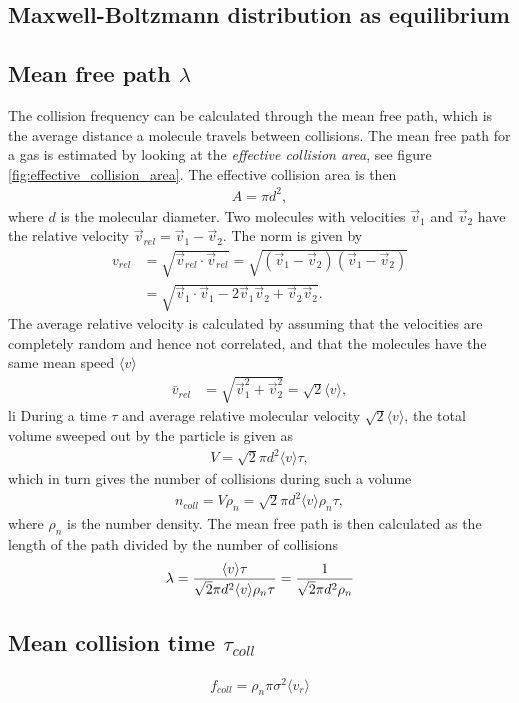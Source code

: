 \subsection{Maxwell-Boltzmann distribution as equilibrium}
\subsection{Mean free path $\lambda$}
\label{sec:mean_free_path_calculation}
The collision frequency can be calculated through the mean free path, which is the average distance a molecule travels between collisions. The mean free path for a gas is estimated by looking at the \textit{effective collision area}, see figure \ref{fig:effective_collision_area}. The effective collision area is then
\begin{align}
	A = \pi d^2,
\end{align}
where $d$ is the molecular diameter. Two molecules with velocities $\vec v_1$ and $\vec v_2$ have the relative velocity $\vec v_{rel} = \vec v_1 - \vec v_2$. The norm is given by
\begin{align}
	v_{rel} &= \sqrt{\vec v_{rel}\cdot \vec v_{rel} } = \sqrt{ (\vec v_1 - \vec v_2)(\vec v_1 - \vec v_2)}\\
	&= \sqrt{\vec v_1\cdot \vec v_1 - 2\vec v_1\vec v_2 + \vec v_2\vec v_2}.
\end{align}
The average relative velocity is calculated by assuming that the velocities are completely random and hence not correlated, and that the molecules have the same mean speed $\langle v\rangle$
\begin{align}
	\bar v_{rel} &= \sqrt{\vec v_1^2 + \vec v_2^2} = \sqrt 2 \langle v\rangle,
\end{align}li
During a time $\tau$ and average relative molecular velocity $\sqrt 2 \langle v\rangle$, the total volume sweeped out by the particle is given as
\begin{align}
	V = \sqrt 2 \pi d^2\langle v\rangle \tau,
\end{align}
which in turn gives the number of collisions during such a volume
\begin{align}
	\label{eq:num_collisions}
	n_{coll} = V\rho_n = \sqrt 2 \pi d^2\langle v\rangle \rho_n \tau,
\end{align}
where $\rho_n$ is the number density. The mean free path is then calculated as the length of the path divided by the number of collisions
\begin{align}
	\lambda = {\langle v\rangle \tau\over \sqrt 2 \pi d^2\langle v\rangle \rho_n\tau} = {1 \over \sqrt 2 \pi d^2 \rho_n}
\end{align}
\subsection{Mean collision time $\tau_{coll}$}
\begin{align}
	\label{eq:coll_frequency}
	f_{coll} = \rho_n \pi \sigma^2 \langle v_r \rangle
\end{align}